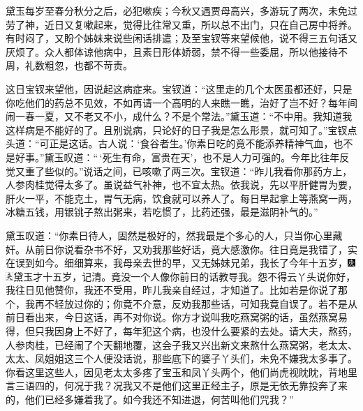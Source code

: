 黛玉每岁至春分秋分之后，必犯嗽疾；今秋又遇贾母高兴，多游玩了两次，未免过劳了神，近日又复嗽起来，觉得比往常又重，所以总不出门，只在自己房中将养。有时闷了，又盼个姊妹来说些闲话排遣；及至宝钗等来望候他，说不得三五句话又厌烦了。众人都体谅他病中，且素日形体娇弱，禁不得一些委屈，所以他接待不周，礼数粗忽，也都不苛责。

这日宝钗来望他，因说起这病症来。宝钗道：“这里走的几个太医虽都还好，只是你吃他们的药总不见效，不如再请一个高明的人来瞧一瞧，治好了岂不好？每年间闹一春一夏，又不老又不小，成什么？不是个常法。”黛玉道：“不中用。我知道我这样病是不能好的了。且别说病，只论好的日子我是怎么形景，就可知了。”宝钗点头道：“可正是这话。古人说：‘食谷者生。’你素日吃的竟不能添养精神气血，也不是好事。”黛玉叹道：“\,‘死生有命，富贵在天’，也不是人力可强的。今年比往年反觉又重了些似的。”说话之间，已咳嗽了两三次。宝钗道：“昨儿我看你那药方上，人参肉桂觉得太多了。虽说益气补神，也不宜太热。依我说，先以平肝健胃为要，肝火一平，不能克土，胃气无病，饮食就可以养人了。每日早起拿上等燕窝一两，冰糖五钱，用银铫子熬出粥来，若吃惯了，比药还强，最是滋阴补气的。”

黛玉叹道：“你素日待人，固然是极好的，然我最是个多心的人，只当你心里藏奸。从前日你说看杂书不好，又劝我那些好话，竟大感激你。往日竟是我错了，实在误到如今。细细算来，我母亲去世的早，又无姊妹兄弟，我长了今年十五岁，{\includegraphics[width=3mm]{../Images/00004}\includegraphics[width=3mm]{../Images/00012}\footnotesize \kaishu 黛玉才十五岁，记清。}竟没一个人像你前日的话教导我。怨不得云丫头说你好，我往日见他赞你，我还不受用，昨儿我亲自经过，才知道了。比如若是你说了那个，我再不轻放过你的；你竟不介意，反劝我那些话，可知我竟自误了。若不是从前日看出来，今日这话，再不对你说。你方才说叫我吃燕窝粥的话，虽然燕窝易得，但只我因身上不好了，每年犯这个病，也没什么要紧的去处。请大夫，熬药，人参肉桂，已经闹了个天翻地覆，这会子我又兴出新文来熬什么燕窝粥，老太太、太太、凤姐姐这三个人便没话说，那些底下的婆子丫头们，未免不嫌我太多事了。你看这里这些人，因见老太太多疼了宝玉和凤丫头两个，他们尚虎视眈眈，背地里言三语四的，何况于我？况我又不是他们这里正经主子，原是无依无靠投奔了来的，他们已经多嫌着我了。如今我还不知进退，何苦叫他们咒我？”

